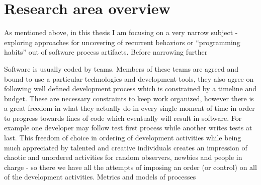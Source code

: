 \section{Research area overview}
As mentioned above, in this thesis I am focusing on a very narrow subject - exploring approaches
for uncovering of recurrent behaviors or ``programming habits'' out of software process artifacts.
Before narrowing further 


Software is usually coded by teams. Members of these teams are agreed and bound to use 
a particular technologies and development tools, they also agree on following well defined 
development process which is constrained by a timeline and budget. These are necessary 
constraints to keep work organized, however there is a great freedom in what they actually 
do in every single moment of time in order to progress towards lines of code which eventually 
will result in software. For example one developer may follow test first process while
another writes tests at last.  This freedom of choice in ordering of development activities 
while being much appreciated by talented and creative individuals creates an impression 
of chaotic and unordered activities for random observers, newbies and people in 
charge - so there we have all the attempts of imposing an order 
(or control) on all of the development activities. Metrics and models of processes




